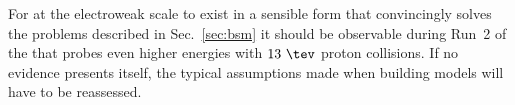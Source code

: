 
For \SUSY at the electroweak scale to exist in a sensible form that
convincingly solves the problems described in Sec.~\ref{sec:bsm} it
should be observable during Run~2 of the \LHC that probes even higher
energies with $13~\tev$ proton collisions. If no evidence presents
itself, the typical assumptions made when building \SUSY models will
have to be reassessed.

